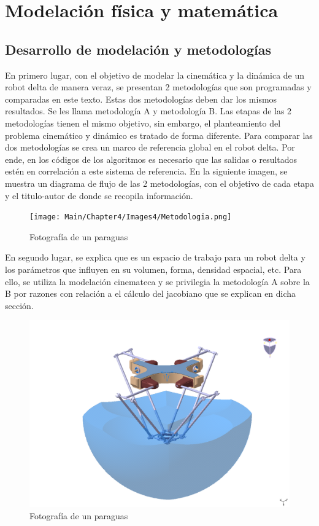 \chapter{Modelación física y matemática}\label{CAP4}
    
\section{Desarrollo de modelación y metodologías}
    En primero lugar, con el objetivo de modelar la cinemática y la dinámica de un robot delta de manera veraz, se presentan 2 metodologías que son programadas y comparadas en este texto. Estas dos metodologías deben dar los mismos resultados. Se les llama metodología A y metodología B. Las etapas de las 2 metodologías tienen el mismo objetivo, sin embargo, el planteamiento del problema cinemático y dinámico es tratado de forma diferente. Para comparar las dos metodologías se crea un marco de referencia global en el robot delta. Por ende, en los códigos de los algoritmos es necesario que las salidas o resultados estén en correlación a este sistema de referencia. En la siguiente imagen, se muestra un diagrama de flujo de las 2 metodologías, con el objetivo de cada etapa y el titulo-autor de donde se recopila información.
    
        
        \begin{figure}[htb]
             \centering
             \texttt{[image: Main/Chapter4/Images4/Metodologia.png]}
              \caption{Fotografía de un paraguas}
              \label{f:Cap4_metodologia}
        \end{figure}
    
         \newpage


    En segundo lugar, se explica que es un espacio de trabajo para un robot delta y los parámetros que influyen en su volumen, forma, densidad espacial, etc. Para ello, se utiliza la modelación cinemateca y se privilegia la metodología A sobre la B por razones con relación a el cálculo del jacobiano que se explican en dicha sección.
    
        \begin{figure}[htb]
             \centering
             \includegraphics[width=0.7\linewidth]{Main/Chapter4/Images4/Metodologia_ws.png}
              \caption{Fotografía de un paraguas}
              \label{f:Cap4_metodologia_ws}
        \end{figure}
    
